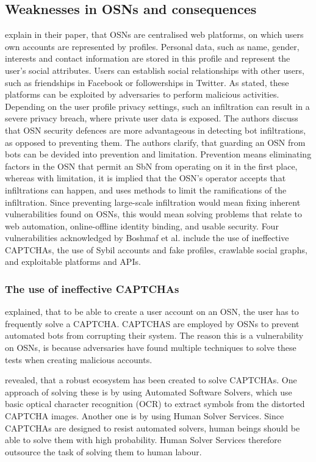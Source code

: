     
    \subsection{Weaknesses in OSNs and consequences}
    \label{subsection:WeaknessesOSNs}
        \textcite[556-559, 573]{DesignAnalysis} explain in their paper, that OSNs are centralised web platforms, on which users own accounts are represented by profiles. Personal data, such as name, gender, interests and contact information are stored in this profile and represent the user’s social attributes. Users can establish social relationships with other users, such as friendships in Facebook or followerships in Twitter. As stated, these platforms can be exploited by adversaries to perform malicious activities. Depending on the user profile privacy settings, such an infiltration can result in a severe privacy breach, where private user data is exposed. The authors discuss that OSN security defences are more advantageous in detecting bot infiltrations, as opposed to preventing them. The authors clarify, that guarding an OSN from bots can be devided into prevention and limitation. Prevention means eliminating factors in the OSN that permit an SbN from operating on it in the first place, whereas with limitation, it is implied that the OSN's operator accepts that infiltrations can happen, and uses methods to limit the ramifications of the infiltration. Since preventing large-scale infiltration would mean fixing inherent vulnerabilities found on OSNs, this would mean solving problems that relate to web automation, online-offline identity binding, and usable security. Four vulnerabilities acknowledged by Boshmaf et al. include the use of ineffective CAPTCHAs, the use of Sybil accounts and fake profiles, crawlable social graphs, and exploitable platforms and APIs. 
        
        \subsubsection{The use of ineffective CAPTCHAs}
            \textcite[559]{DesignAnalysis} explained, that to be able to create a user account on an OSN, the user has to frequently solve a CAPTCHA. CAPTCHAS are employed by OSNs to prevent automated bots from corrupting their system. The reason this is a vulnerability on OSNs, is because adversaries have found multiple techniques to solve these tests when creating malicious accounts. 
            
            \textcite[435, 437, 439]{Captcha} revealed, that a robust ecosystem has been created to solve CAPTCHAs. One approach of solving these is by using Automated Software Solvers, which use basic optical character recognition (OCR) to extract symbols from the distorted CAPTCHA images. Another one is by using Human Solver Services. Since CAPTCHAs are designed to resist automated solvers, human beings should be able to solve them with high probability. Human Solver Services therefore outsource the task of solving them to human labour.
        
